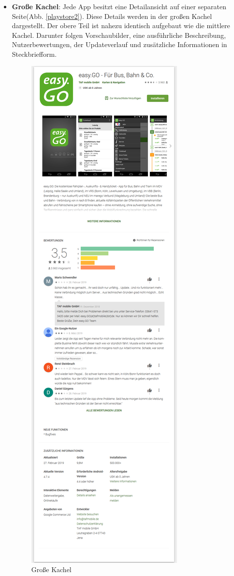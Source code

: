 \begin{itemize}
	\item \textbf{Große Kachel}:
	Jede App besitzt eine Detailansicht auf einer separaten Seite(Abb. \ref{playstore2}). Diese Details werden in der großen Kachel dargestellt.
	Der obere Teil ist nahezu identisch aufgebaut wie die mittlere Kachel. Darunter folgen Vorschaubilder, eine ausführliche Beschreibung, Nutzerbewertungen, der Updateverlauf und zusätzliche Informationen in Steckbriefform.
	\begin{figure}[ht]
		\centering
		\includegraphics[scale=0.2]{pics/kachel3.png}
		\caption{Große Kachel}
		\label{kachel3}
	\end{figure}

\end{itemize}

